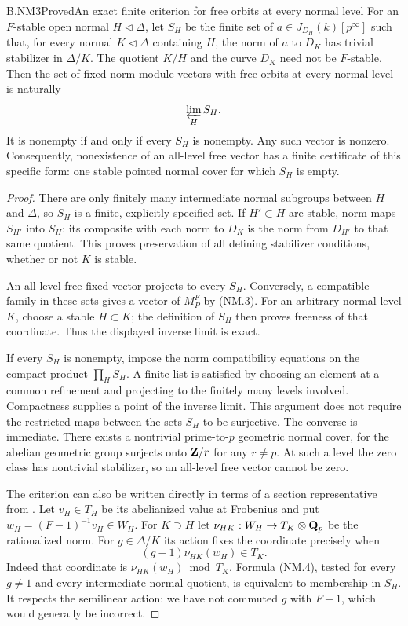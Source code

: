 \begin{claim}{B.NM3}{Proved}{An exact finite criterion for free orbits at every normal level}
For an $F$-stable open normal $H\triangleleft\Delta$, let $S_H$
be the finite set of $a\in J_{D_H}(k)[p^\infty]$ such that, for
every normal $K\triangleleft\Delta$ containing $H$, the norm of
$a$ to $D_K$ has trivial stabilizer in $\Delta/K$. The quotient
$K/H$ and the curve $D_K$ need not be $F$-stable. Then the set of
fixed norm-module vectors with free orbits at every normal level
is naturally
\[
                         \varprojlim_H S_H.
\]
It is nonempty if and only if every $S_H$ is nonempty. Any such
vector is nonzero. Consequently, nonexistence of an all-level free
vector has a finite certificate of this specific form: one stable
pointed normal cover for which $S_H$ is empty.
\end{claim}
\begin{proof}
There are only finitely many intermediate normal subgroups between
$H$ and $\Delta$, so $S_H$ is a finite, explicitly specified set.
If $H'\subset H$ are stable, norm maps $S_{H'}$ into $S_H$:
its composite with each norm to $D_K$ is the norm from $D_{H'}$
to that same quotient. This proves preservation of all defining
stabilizer conditions, whether or not $K$ is stable.

An all-level free fixed vector projects to every $S_H$. Conversely,
a compatible family in these sets gives a vector of $M_P^F$ by
(NM.3). For an arbitrary normal level $K$, choose a stable
$H\subset K$; the definition of $S_H$ then proves freeness of
that coordinate. Thus the displayed inverse limit is exact.

If every $S_H$ is nonempty, impose the norm compatibility equations
on the compact product $\prod_H S_H$. A finite list is satisfied
by choosing an element at a common refinement and projecting to
the finitely many levels involved. Compactness supplies a point
of the inverse limit. This argument does not require the restricted
maps between the sets $S_H$ to be surjective. The converse is
immediate. There exists a nontrivial prime-to-$p$ geometric normal
cover, for the abelian geometric group surjects onto $\mathbf Z/r$ for
any $r\ne p$. At such a level the zero class has nontrivial
stabilizer, so an all-level free vector cannot be zero.

The criterion can also be written directly in terms of a section
representative from . Let $v_H\in T_H$ be
its abelianized value at Frobenius and put
$w_H=(F-1)^{-1}v_H\in W_H$. For $K\supset H$ let
$\nu_{HK}:W_H\to T_K\otimes\mathbf Q_p$ be the rationalized norm.
For $g\in\Delta/K$ its action fixes the coordinate precisely when
\[
                         (g-1)\nu_{HK}(w_H)\in T_K.           \tag{NM.4}
\]
Indeed that coordinate is $\nu_{HK}(w_H)\bmod T_K$.
Formula (NM.4), tested for every $g\ne1$ and every intermediate
normal quotient, is equivalent to membership in $S_H$. It
respects the semilinear action: we have not commuted $g$ with
$F-1$, which would generally be incorrect.
\end{proof}

